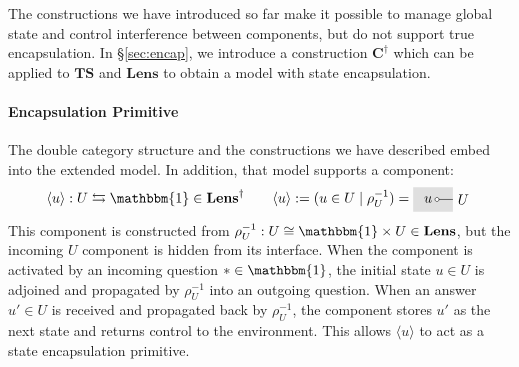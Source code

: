 \documentclass[acmsmall,screen,review,anonymous]{acmart}
\newcommand{\lensarrow}{\leftrightarrows}
\begin{document}
The constructions we have introduced so far
make it possible to manage global state
and control interference between components,
but do not support true encapsulation.
In \S\ref{sec:encap},
%
%
we introduce a construction $\mathbf{C}^\dagger$
which can be applied to $\mathbf{TS}$ and $\mathbf{Lens}$
to obtain a model with state encapsulation.


\paragraph{Encapsulation Primitive}

The double category structure
and the constructions we have described
embed into the extended model.
In addition,
that model supports a component:
\[
  \langle u \rangle : U \lensarrow \mathbbm{1} \in \mathbf{Lens}^\dagger
  \qquad
  \langle u \rangle := (u \in U \mid \rho^{-1}_U)
  =
  \begin{tikzpicture}[xscale=0.4,yscale=0.3,baseline=(u.base)]
    \fill[tssdbg] (-1.5,-1) rectangle (1,1);
    \draw (0,0)
      node[draw,fill=white,circle,inner sep=1pt] {}
      node[left] (u) {$u$}
      -- (1,0) node[right]{$U$};
  \end{tikzpicture}
\]
This component is constructed from
$\rho^{-1}_U : U \cong \mathbbm{1} \times U \in \mathbf{Lens}$,
but the incoming $U$ component is hidden from its interface.
When the component is activated
by an incoming question $* \in \mathbbm{1}$,
the initial state $u \in U$ is adjoined
and propagated by $\rho^{-1}_U$ into an outgoing question.
When an answer $u' \in U$ is received
and propagated back by $\rho^{-1}_U$,
the component stores $u'$ as the next state and returns control to the environment.
This allows $\langle u \rangle$ to act
as a state encapsulation primitive.
\end{document}
